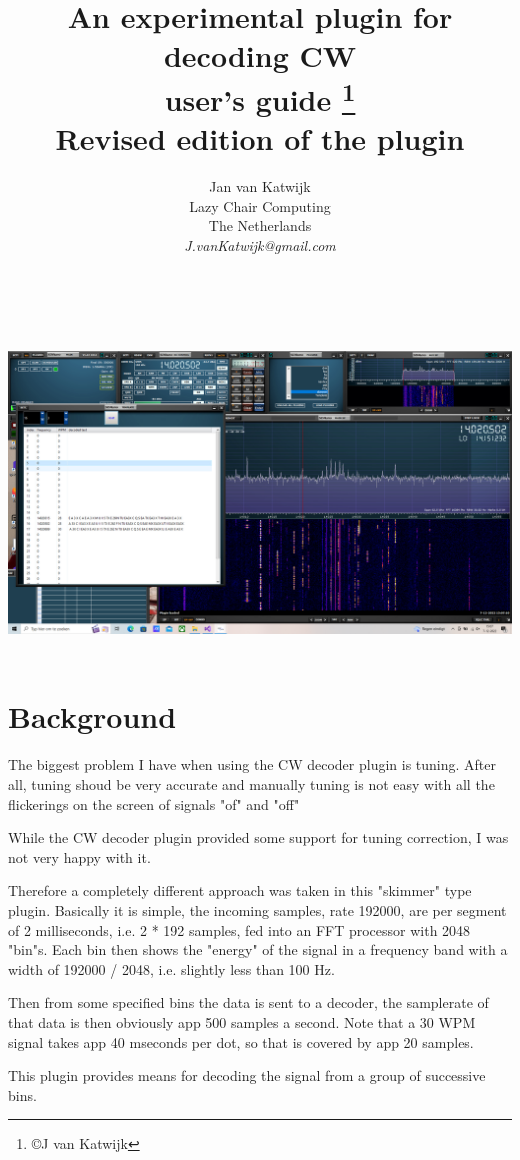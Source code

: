 \documentclass[10pt]{article}
\begin{document}
\title{An experimental plugin for decoding CW\\
{\small user's guide {\footnote {\copyright J van Katwijk}}\\
Revised edition of the plugin}}
\author{
Jan van Katwijk\\
Lazy Chair Computing \\
The Netherlands\\
{\em J.vanKatwijk@gmail.com}}
\maketitle
\ \\
\ \\
\includegraphics[width=160mm]{skimmer.png}
\ \\
\section{Background}
The biggest problem I have when using the CW decoder plugin is tuning. 
After all, tuning shoud be very accurate and manually tuning is not
easy with all the flickerings on the screen of signals "of" and "off"
\par
While the CW decoder plugin provided some support for tuning correction,
I was not very happy with it.
\par
Therefore a completely different approach was taken in this "skimmer" type
plugin.
Basically it is simple, the incoming samples, rate 192000, are per segment of
2 milliseconds, i.e. 2 * 192 samples, fed into an FFT processor with 
2048 "bin"s.
Each bin then shows the "energy" of the signal in a frequency band with
a width of 192000 / 2048, i.e. slightly less than 100 Hz.
\par
Then from some specified bins the data is sent to a decoder, 
the samplerate of that data is then obviously app 500 samples a second.
Note that a 30 WPM signal takes app 40 mseconds per dot, so that is covered
by app 20 samples.
\par
This plugin provides means for decoding the signal from a group of successive
bins.
\end{document}
